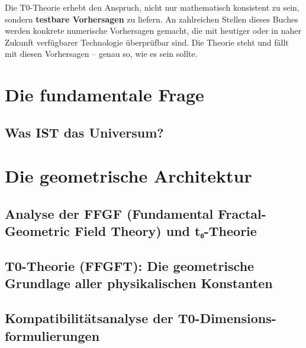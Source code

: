 \documentclass[11pt,openright,twoside]{book}
\begin{document}
\bigskip

Die T0-Theorie erhebt den Anspruch, nicht nur mathematisch konsistent zu sein, sondern \textbf{testbare Vorhersagen} zu liefern. An zahlreichen Stellen dieses Buches werden konkrete numerische Vorhersagen gemacht, die mit heutiger oder in naher Zukunft verfügbarer Technologie überprüfbar sind. Die Theorie steht und fällt mit diesen Vorhersagen -- genau so, wie es sein sollte.

\tableofcontents

\mainmatter
\pagestyle{fancy}

\part{Die fundamentale Frage}

\chapter{Was IST das Universum?}


\part{Die geometrische Architektur}

\chapter{Analyse der FFGF (Fundamental Fractal-Geometric Field Theory) und t₀-Theorie}


\chapter{T0-Theorie (FFGFT): Die geometrische Grundlage aller physikalischen Konstanten}


\chapter{Kompatibilitätsanalyse der T0-Dimensions-formulierungen}

\end{document}
